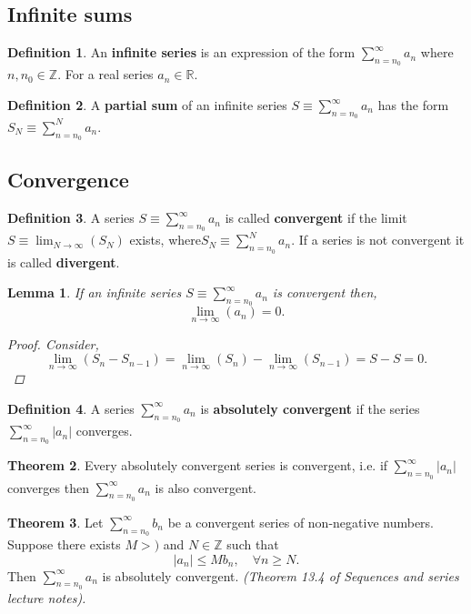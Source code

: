 \documentclass[12pt, a4paper]{article}
\newcommand{\bb}[1]{\mathbb{#1}}
\theoremstyle{definition}
\newtheorem{definition}{Definition}[section]
\newtheorem{theorem}{Theorem}[section]
\theoremstyle{plain}
\newtheorem{lemma}[theorem]{Lemma}
\begin{document}
\subsection{Infinite sums}

\begin{definition}
An \textbf{infinite series} is an expression of the form $\sum_{n=n_0}^{\infty} a_n$ where $n, n_0 \in \bb{Z}.$ For a real series $a_n \in \bb{R}.$
\end{definition}

\begin{definition}
A \textbf{partial sum} of an infinite series $S \equiv \sum_{n=n_0}^{\infty} a_n$ has the form $S_N \equiv \sum_{n=n_0}^{N} a_n.$
\end{definition}

\subsection{Convergence}

\begin{definition}
A series $S \equiv \sum_{n=n_0}^{\infty} a_n$ is called \textbf{convergent} if the limit $S\equiv \lim_{N\to \infty} (S_N)$ exists, where$ S_N \equiv \sum_{n=n_0}^{N} a_n.$ If a series is not convergent it is called \textbf{divergent}.
\end{definition}

\begin{lemma}
If an infinite series $S\equiv \sum_{n=n_0}^{\infty} a_n$ is convergent then, $$\lim_{n\to \infty}(a_n)=0.$$

\begin{proof}
Consider, $$\lim_{n\to \infty} (S_n-S_{n-1})=\lim_{n\to \infty}(S_n)-\lim_{n\to \infty}(S_{n-1})=S-S=0.$$
\end{proof}
\end{lemma}

\begin{definition}
A series $\sum_{n=n_0}^{\infty} a_n$ is \textbf{absolutely convergent} if the series $\sum_{n=n_0}^{\infty} |a_n|$ converges.
\end{definition}

\begin{theorem}
Every absolutely convergent series is convergent, i.e. if $\sum_{n=n_0}^{\infty} |a_n|$ converges then $\sum_{n=n_0}^{\infty} a_n$ is also convergent.
\end{theorem}

\begin{theorem}
Let $\sum_{n=n_0}^{\infty} b_n$ be a convergent series of non-negative numbers. Suppose there exists $M>)$ and $N\in \bb{Z}$ such that $$|a_n|\leq Mb_n, \quad \forall n\geq N.$$ Then $\sum_{n=n_0}^{\infty} a_n$ is absolutely convergent. \textit{(Theorem 13.4 of Sequences and series lecture notes).}
\end{theorem}
\end{document}
